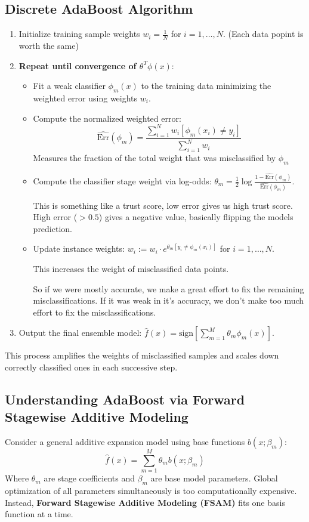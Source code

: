 \documentclass{article}
\begin{document}
\subsection{Discrete AdaBoost Algorithm}
\begin{enumerate}
  \item Initialize training sample weights $w_i = \frac{1}{N}$ for $i = 1,\dots,N$. (Each data popint is worth the same)
  \item \textbf{Repeat until convergence of $\theta^T \phi(x)$}:
  \begin{itemize}
    \item Fit a weak classifier $\phi_m(x)$ to the training data minimizing the weighted error using weights $w_i$.
    \item Compute the normalized weighted error:
    \[ \hat{\text{Err}}(\phi_m) = \frac{\sum_{i=1}^N w_i \left[\phi_m(x_i) \neq y_i\right]}{\sum_{i=1}^N w_i} \]
    Measures the fraction of the total weight that was misclassified by $\phi_m$
    \item Compute the classifier stage weight via log-odds: $\theta_m = \frac{1}{2}\log \frac{1-\hat{\text{Err}}(\phi_m)}{\hat{\text{Err}}(\phi_m)}$.
    
    This is something like a trust score, low error gives us high trust score. High error ($>0.5$) gives a negative value, basically flipping the models prediction.
    
    \item Update instance weights: $w_i := w_i \cdot e^{\theta_m \left[y_i \neq \phi_m(x_i)\right]}$ for $i=1,\dots,N$.
  
    This increases the weight of misclassified data points.

    So if we were mostly accurate, we make a great effort to fix the remaining misclassifications. If it was weak in it's accuracy, we don't make too much effort to fix the misclassifications.
  \end{itemize}
  \item Output the final ensemble model: $\hat{f}(x) = \text{sign}\left[\sum_{m=1}^M \theta_m \phi_m(x)\right]$.
\end{enumerate}
This process amplifies the weights of misclassified samples and scales down correctly classified ones in each successive step.

\subsection{Understanding AdaBoost via Forward Stagewise Additive Modeling}
Consider a general additive expansion model using base functions $b(x;\beta_m)$:
\[ \hat{f}(x) = \sum_{m=1}^M \theta_m b(x; \beta_m) \]
Where $\theta_m$ are stage coefficients and $\beta_m$ are base model parameters. Global optimization of all parameters simultaneously is too computationally expensive. Instead, \textbf{Forward Stagewise Additive Modeling (FSAM)} fits one basis function at a time.
\end{document}

